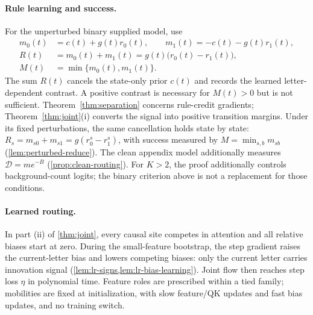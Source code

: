 \paragraph{Rule learning and success.}
For the unperturbed binary supplied model, use
\begin{equation}\label{eq:binary-rule-observables}
 \begin{aligned}
 m_0(t)&=c(t)+g(t)r_0(t),\qquad m_1(t)=-c(t)-g(t)r_1(t),\\
 R(t)&=m_0(t)+m_1(t)=g(t)\bigl(r_0(t)-r_1(t)\bigr),\\
 M(t)&=\min\{m_0(t),m_1(t)\}.
 \end{aligned}
\end{equation}
The sum $R(t)$ cancels the state-only prior $c(t)$ and records the learned
letter-dependent contrast. A positive contrast is necessary for $M(t)>0$
but is not sufficient. Theorem~\ref{thm:separation} concerns rule-credit gradients;
Theorem~\ref{thm:joint}(i) converts the signal into positive transition margins.
Under its fixed perturbations, the same cancellation holds state by state:
$R_s=m_{s0}+m_{s1}=g(r^s_0-r^s_1)$, with success measured by
$M=\min_{s,b}m_{sb}$ (\cref{lem:perturbed-reduce}).
The clean appendix model additionally measures $\mathcal D=me^{-B}$
(\cref{prop:clean-routing}).
For $K>2$, the proof additionally controls background-count logits;
the binary criterion above is not a replacement for those conditions.

\paragraph{Learned routing.}
In part (ii) of \cref{thm:joint}, every causal site competes in attention
and all relative biases start at zero. During the small-feature bootstrap, the step gradient raises
the current-letter bias and lowers competing biases: only the current letter carries innovation
signal (\cref{lem:lr-signs,lem:lr-bias-learning}). Joint flow then reaches step loss $\eta$ in
polynomial time. Feature roles are prescribed within a tied family; mobilities are fixed at
initialization, with slow feature/QK updates and fast bias updates, and no training switch.

